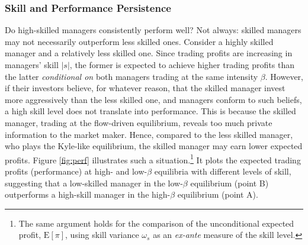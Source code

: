 
\subsubsection{Skill and Performance Persistence}

Do high-skilled managers consistently perform well? Not always: skilled managers may not necessarily outperform less skilled ones. Consider a highly skilled manager and a relatively less skilled one. Since trading profits are increasing in managers' skill $|s|$, the former is expected to achieve higher trading profits than the latter \emph{conditional on} both managers trading at the same intensity $\beta$. However, if their investors believe, for whatever reason, that the skilled manager invest more aggressively than the less skilled one, and managers conform to such beliefs, a high skill level does not translate into performance. This is because the skilled manager, trading at the flow-driven equilibrium, reveals too much private information to the market maker. Hence, compared to the less skilled manager, who plays the Kyle-like equilibrium, the skilled manager may earn lower expected profits. Figure \ref{fig:perf}  illustrates such a situation.\footnote{The same argument holds for the comparison of the unconditional expected profit, $\mathrm{E}[\pi]$, using skill variance $\omega_{s}$ as an \textit{ex-ante} measure of the skill level.} It plots the expected trading profits (performance) at high- and low-$\beta$ equilibria with different levels of skill, suggesting that a low-skilled manager in the low-$\beta$ equilibrium (point B) outperforms a high-skill manager in the high-$\beta$ equilibrium (point A).

